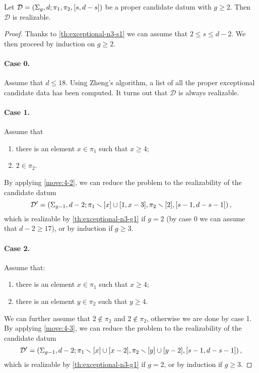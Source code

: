 \documentclass{article}
\begin{document}
\begin{theorem}
Let $\mathcal{D}=\left(\Sigma_g,d;\pi_1,\pi_2,[s,d-s]\right)$ be a proper candidate datum with $g\ge 2$. Then $\mathcal{D}$ is realizable.
\end{theorem}
\begin{proof}
Thanks to \cref{th:exceptional-n3-s1} we can assume that $2\le s\le d-2$. We then proceed by induction on $g\ge 2$.

\paragraph{Case 0.} Assume that $d\le 18$. Using Zheng's algorithm, a list of all the proper exceptional candidate data has been computed. It turns out that $\mathcal{D}$ is always realizable.

\paragraph{Case 1.} Assume that
\begin{enumerate}
\item there is an element $x\in\pi_1$ such that $x\ge 4$;
\item $2\in\pi_2$.
\end{enumerate}
By applying \cref{move:4-2}, we can reduce the problem to the realizability of the candidate datum
\[
\mathcal{D}'=\left(\Sigma_{g-1},d-2;\pi_1\smallsetminus[x]\cup[1,x-3],\pi_2\smallsetminus[2],[s-1,d-s-1]\right),
\]
which is realizable by \cref{th:exceptional-n3-g1} if $g=2$ (by case 0 we can assume that $d-2\ge 17$), or by induction if $g\ge 3$.

\paragraph{Case 2.} Assume that:
\begin{enumerate}
\item there is an element $x\in\pi_1$ such that $x\ge 4$;
\item there is an element $y\in\pi_2$ such that $y\ge 4$.
\end{enumerate}
We can further assume that $2\not\in\pi_2$ and $2\not\in\pi_2$, otherwise we are done by case 1. By applying \cref{move:4-3}, we can reduce the problem to the realizability of the candidate datum
\[
\mathcal{D}'=\left(\Sigma_{g-1},d-2;\pi_1\smallsetminus[x]\cup[x-2],\pi_2\smallsetminus[y]\cup[y-2],[s-1,d-s-1]\right),
\]
which is realizable by \cref{th:exceptional-n3-g1} if $g=2$, or by induction if $g\ge 3$.


\end{proof}
\end{document}
